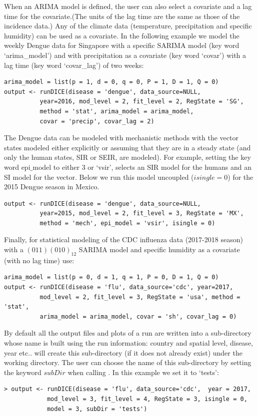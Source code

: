\documentclass[a4paper]{article}
\begin{document}
When an ARIMA model is defined, the user can also select a covariate and a lag time for the covariate.(The units of the lag time are the same as those of the incidence data.)  Any of the climate data (temperature, precipitation and specific humidity) can be used as a covariate. In the following example we model the weekly Dengue data for Singapore with a specific SARIMA model (key word `arima\_model') and with precipitation as a covariate (key word `covar') with a lag time (key word `covar\_lag') of two weeks:

\begin{verbatim}
arima_model = list(p = 1, d = 0, q = 0, P = 1, D = 1, Q = 0)
output <- runDICE(disease = 'dengue', data_source=NULL,
          year=2016, mod_level = 2, fit_level = 2, RegState = 'SG',
          method = 'stat', arima_model = arima_model,
          covar = 'precip', covar_lag = 2)
\end{verbatim}

The Dengue data can be modeled with mechanistic methods with the vector states modeled either explicitly or assuming that they are in a steady state (and only the human states, SIR or SEIR, are modeled).
For example, setting the key word epi$\_$model to either 3 or `vsir', selects an SIR model for the humans and an SI model for the vector. Below we run this model uncoupled ($isingle = 0$) for the 2015 Dengue season in Mexico.

\begin{verbatim}
output <- runDICE(disease = 'dengue', data_source=NULL,
          year=2015, mod_level = 2, fit_level = 3, RegState = 'MX',
          method = 'mech', epi_model = 'vsir', isingle = 0)
\end{verbatim}

Finally, for statistical modeling of the CDC influenza data (2017-2018 season) with a $(011)(010)_{12}$ SARIMA model and specific humidity as a covariate (with no lag time) use:

\begin{verbatim}
arima_model = list(p = 0, d = 1, q = 1, P = 0, D = 1, Q = 0)
output <- runDICE(disease = 'flu', data_source='cdc', year=2017,
          mod_level = 2, fit_level = 3, RegState = 'usa', method = 'stat',
          arima_model = arima_model, covar = 'sh', covar_lag = 0)
\end{verbatim}


By default all the output files and plots of a  run are written into a sub-directory  whose name is built using the run information: country and spatial level, disease, year etc..   will create this sub-directory (if it does not already exist) under the working directory.  The user can choose the name of this sub-directory by setting the keyword $subDir$ when calling . In this example we set it to `tests':
\begin{verbatim}
> output <- runDICE(disease = 'flu', data_source='cdc',  year = 2017,
            mod_level = 3, fit_level = 4, RegState = 3, isingle = 0,
            model = 3, subDir = 'tests')
\end{verbatim}
\end{document}
